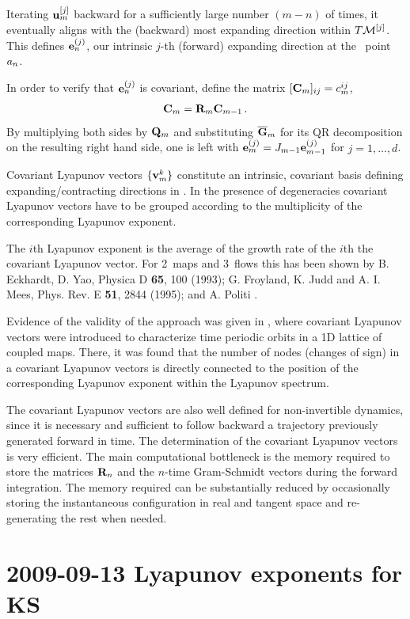 Iterating ${\bf u}_m^{[j]}$ backward for a sufficiently large
number $(m-n)$ of times, it eventually aligns with the
(backward) most expanding direction within $T{\cal M}^{[j]}$. This
defines  ${\bf e}_n^{(j)}$, our intrinsic $j$-th (forward)
expanding direction at the \statesp\ point $a_n$.

In order to verify that ${\bf e}_n^{(j)}$ is covariant, define
the matrix $[{\bf C}_m]_{ij} = c_m^{ij}$,
\[
{\bf C}_m = {\bf R}_m {\bf C}_{m-1}
\,.
\]
By multiplying both sides by ${\bf Q}_m$ and substituting
$\overline {\bf G}_m$ for its QR decomposition on the resulting
right hand side, one is left with ${\bf
e}_{m}^{(j)}=J_{m-1} {\bf e}_{m-1}^{(j)}$ for $j=1,\ldots,
d$.

Covariant Lyapunov vectors $\{{\bf v}_{m}^k\}$ constitute an
intrinsic, covariant basis defining expanding/contracting
directions in \statesp.
In the presence of degeneracies covariant Lyapunov vectors
have to be grouped according to the multiplicity of the
corresponding Lyapunov exponent.

The $i$th Lyapunov exponent is the average of the growth rate
of the $i$th the covariant Lyapunov vector. For 2\dmn\ maps and
3\dmn\ flows this has been shown by B. Eckhardt, D. Yao,
Physica D {\bf 65}, 100 (1993); G. Froyland, K. Judd and A. I.
Mees, Phys. Rev. E {\bf 51}, 2844 (1995); and A. Politi
\etal{}.

Evidence of the validity of the approach was given in
, where covariant Lyapunov vectors were
introduced to characterize time periodic orbits in a 1D
lattice of coupled maps. There, it was found that the number
of nodes (changes of sign) in a covariant Lyapunov vectors is
directly connected to the position of the corresponding
Lyapunov exponent within the Lyapunov spectrum.


The covariant Lyapunov vectors are also well defined for
non-invertible dynamics, since it is necessary and sufficient
to follow backward a trajectory previously generated forward in
time. The determination of the covariant Lyapunov vectors is
very efficient. The main computational bottleneck is the memory
required to store the matrices ${\bf R}_n$ and the $n$-time
Gram-Schmidt vectors during the forward integration. The memory
required can be substantially reduced by occasionally storing
the instantaneous configuration in real and tangent space and
re-generating the rest when needed.


\section{2009-09-13 Lyapunov exponents for KS}


